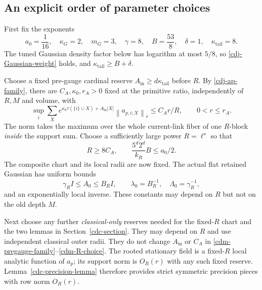 \documentclass[11pt]{article}
\theoremstyle{remark}
\newcommand{\norm}[1]{\left\|#1\right\|}
\begin{document}
\subsection{An explicit order of parameter choices}
\label{cdm-parameters-section}

First fix the exponents
\begin{equation}
 a_0=\frac1{16},\quad \kappa_G=2,\quad m_G=3,\quad
 \gamma=8,\quad B=\frac{53}{8},\quad \delta=1,\quad
 \kappa_{\mathrm{tail}}=8.
 \label{cdm-exponents}
\end{equation}
The tuned Gaussian density factor below has logarithm at most
$5/8$, so \eqref{cdj-Gaussian-weight} holds, and
$\kappa_{\mathrm{tail}}\ge B+\delta$.

Choose a fixed pre-gauge cardinal reserve
$A_{\mathrm{in}}\ge d\kappa_{\mathrm{tail}}$ before $R$.
By \eqref{cdj-ap-family}, there are $C_A,\kappa_0,r_A>0$ fixed
at the primitive ratio, independently of $R,M$ and volume, with
\begin{equation}
 \sup_i\sum_Xe^{\kappa_0\tau(\{i\}\cup X)+A_{\mathrm{in}}|X|}
                  \norm{a_{p,i;X}}_r
       \le C_A r/R,\qquad 0<r\le r_A.
 \label{cdm-pregauge-family}
\end{equation}
The norm takes the maximum over the whole current-link fiber
of one $R$-block \emph{inside} the support sum.
Choose a sufficiently large power $R=\ell^s$ so that
\begin{equation}
 R\ge8C_A,\qquad
 \frac{5^d2^d}{k_R}B\le a_0/2.
 \label{cdm-R-choice}
\end{equation}
The composite chart and its local radii are now fixed. The actual
flat retained Gaussian has uniform bounds
\begin{equation}
 \gamma_RI\le A_0\le B_RI,\qquad
 \lambda_0=B_R^{-1},\quad \Lambda_0=\gamma_R^{-1},
 \label{cdm-spectral-bounds}
\end{equation}
and an exponentially local inverse. These constants may depend
on $R$ but not on the old depth $M$.

Next choose any further \emph{classical-only} reserves needed
for the fixed-$R$ chart and the two lemmas in
Section~\ref{cdc-section}. They may depend on $R$ and use
independent classical outer radii. They do not change
$A_{\mathrm{in}}$ or $C_A$ in
\eqref{cdm-pregauge-family}--\eqref{cdm-R-choice}.
The rooted stationary field is a fixed-$R$ local analytic
function of $a_p$; its support norm is $O_R(r)$ with any such
fixed reserve. Lemma~\ref{cdc-precision-lemma} therefore
provides strict symmetric precision pieces with row norm
$O_R(r)$.
\end{document}
